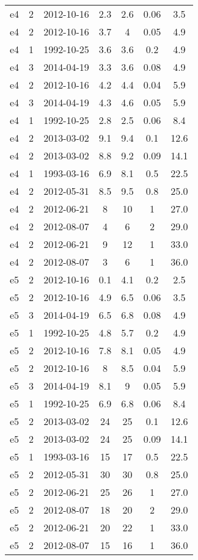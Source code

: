 \begin{longtable}{ccccccc}
e4 & 2 & 2012-10-16 & 2.3 & 2.6 & 0.06 & 3.5 \\
e4 & 2 & 2012-10-16 & 3.7 & 4 & 0.05 & 4.9 \\
e4 & 1 & 1992-10-25 & 3.6 & 3.6 & 0.2 & 4.9 \\
e4 & 3 & 2014-04-19 & 3.3 & 3.6 & 0.08 & 4.9 \\
e4 & 2 & 2012-10-16 & 4.2 & 4.4 & 0.04 & 5.9 \\
e4 & 3 & 2014-04-19 & 4.3 & 4.6 & 0.05 & 5.9 \\
e4 & 1 & 1992-10-25 & 2.8 & 2.5 & 0.06 & 8.4 \\
e4 & 2 & 2013-03-02 & 9.1 & 9.4 & 0.1 & 12.6 \\
e4 & 2 & 2013-03-02 & 8.8 & 9.2 & 0.09 & 14.1 \\
e4 & 1 & 1993-03-16 & 6.9 & 8.1 & 0.5 & 22.5 \\
e4 & 2 & 2012-05-31 & 8.5 & 9.5 & 0.8 & 25.0 \\
e4 & 2 & 2012-06-21 & 8 & 10 & 1 & 27.0 \\
e4 & 2 & 2012-08-07 & 4 & 6 & 2 & 29.0 \\
e4 & 2 & 2012-06-21 & 9 & 12 & 1 & 33.0 \\
e4 & 2 & 2012-08-07 & 3 & 6 & 1 & 36.0 \\
e5 & 2 & 2012-10-16 & 0.1 & 4.1 & 0.2 & 2.5 \\
e5 & 2 & 2012-10-16 & 4.9 & 6.5 & 0.06 & 3.5 \\
e5 & 3 & 2014-04-19 & 6.5 & 6.8 & 0.08 & 4.9 \\
e5 & 1 & 1992-10-25 & 4.8 & 5.7 & 0.2 & 4.9 \\
e5 & 2 & 2012-10-16 & 7.8 & 8.1 & 0.05 & 4.9 \\
e5 & 2 & 2012-10-16 & 8 & 8.5 & 0.04 & 5.9 \\
e5 & 3 & 2014-04-19 & 8.1 & 9 & 0.05 & 5.9 \\
e5 & 1 & 1992-10-25 & 6.9 & 6.8 & 0.06 & 8.4 \\
e5 & 2 & 2013-03-02 & 24 & 25 & 0.1 & 12.6 \\
e5 & 2 & 2013-03-02 & 24 & 25 & 0.09 & 14.1 \\
e5 & 1 & 1993-03-16 & 15 & 17 & 0.5 & 22.5 \\
e5 & 2 & 2012-05-31 & 30 & 30 & 0.8 & 25.0 \\
e5 & 2 & 2012-06-21 & 25 & 26 & 1 & 27.0 \\
e5 & 2 & 2012-08-07 & 18 & 20 & 2 & 29.0 \\
e5 & 2 & 2012-06-21 & 20 & 22 & 1 & 33.0 \\
e5 & 2 & 2012-08-07 & 15 & 16 & 1 & 36.0 \\

\end{longtable}
